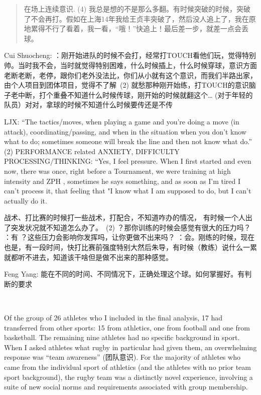 \begin{CJK}{UTF8}{gbsn}
\begin{quotation}
  在场上连续意识. (4) 我总是想的不是那么多翻。有时候突破的时候，突破了不会再打。假如在上海14年我给王贞丰突破了，然后没人追上了，我在原地累得不行了看着，我一看，“哦！”快追上！最后差一步，就差一点会丢球。
\end{quotation}






Cui Shuocheng:
：刚开始进队的时候不会打，经常打TOUCH看他们玩，觉得特别帅。当时我不会，当时就觉得特别困难，什么时候插上，什么时候穿球，意识方面老断老断，老停，跟你们老外没法比，你们从小就有这个意识，而我们半路出家，由个人项目到团体项目，觉得不了解 (2) 就愁那种刚开始练，打TOUCH的意识脑子老中断，打个重叠不知道什么时候传球，刚开始的时候就翻这个… (对于年轻的队员）对对，拿球的时候不知道什么时候要传还是不传





LJX:
“The tactics/moves, when playing a game and you’re doing a move (in attack), coordinating/passing, and when in the situation when you don’t know what to do; sometimes someone will break the line and then not know what do.” (2) PERFORMANCE related ANXIETY, DIFFICULTY PROCESSING/THINKING: “Yes, I feel pressure.  When I first started and even now, there was once, right before a Tournament, we were training at high intensity and ZPH , sometimes he says something, and as soon as I'm tired I can't process it, that feeling that "I know what I am supposed to do, but I can't actually do it.

战术、打比赛的时候打一些战术，打配合，不知道咋办的情况， 有时候一个人出了突发状况就不知道怎么办了。 (2) ？那你训练的时候会感觉有很大的压力吗？
：有
？这些压力会影响你发挥吗，让你更做不出来吗？
：会。刚练的时候，现在也是，有一段时间，快打比赛前强度特别大然后朱导，有时候（教练）说什么一累就都听不进去，知道该干啥但是做不出来的那种感觉。

Feng Yang:
能在不同的时间、不同情况下，正确处理这个球。如何掌握好。有判断的要求 



 






Of the group of 26 athletes who I included in the final analysis, 17 had transferred from other sports: 15 from athletics, one from football and one from basketball.  The remaining nine athletes had no specific background in sport.  When I asked athletes what rugby in particular had given them, an overwhelming response was ``team awareness'' (团队意识).  For the majority of athletes who came from the individual sport of athletics (and the athletes with no prior team sport background), the rugby team was a distinctly novel experience, involving a suite of new social norms and requirements associated with group membership.



\end{CJK}
